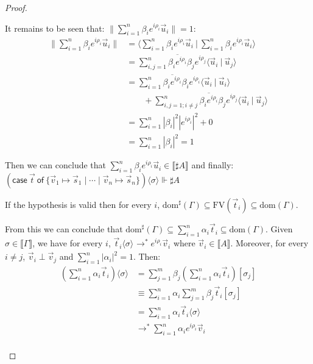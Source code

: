 \documentclass[a4paper,UKenglish,numberwithinsect,pdfa,anonymous]{lipics-v2021}
\theoremstyle{restatestyle}
\newcommand\lra{\longrightarrow}
\newcommand\ansubst[2]{\ensuremath{\langle #1 \rangle_{#2}}}
\newcommand\dom[1]{\mathrm{dom}(#1)}
\newcommand\sdom[1]{\mathrm{dom}^{\sharp}(#1)}
\newcommand\FV[1]{\mathrm{FV}(#1)}
\def\scal#1#2{\langle{#1}~|~{#2}\rangle}
\def\gencase#1#2#3#4#5{\ensuremath{\mathsf{case}~#1~\mathsf{of}~\{#2\mapsto #4 \mid \dotsb \mid #3\mapsto #5\}}}
\def\eval{\lra^*}
\def\sem#1{\llbracket#1\rrbracket}
\def\real{\Vdash}
\begin{document}
\begin{proof}
\begin{description}
    It remains to be seen that: $\|\sum_{i=1}^{n}\beta_i e^{i\rho_i} \vec{u}_{i}\|=1$:
    \begin{align*}
        \|\sum_{i=1}^{n}\beta_i e^{i\rho_i} \vec{u}_{i}\| &= \scal{\sum_{i=1}^{n}\beta_i e^{i\rho_i} \vec{u}_{i}}{\sum_{i=1}^{n}\beta_i e^{i\rho_i} \vec{u}_{i}}\\
        &= \sum_{i,j=1}^{n}\overline{\beta_i e^{i\rho_i}}\beta_j e^{i\rho_j} \scal{\vec{u}_{i}}{\vec{u}_{j}}\\
        &= \sum_{i=1}^{n}\overline{\beta_i e^{i\rho_i}}\beta_i e^{i\rho_i} \scal{\vec{u}_{i}}{\vec{u}_{i}}\\
        &\qquad + \sum_{i,j=1; i\neq j}^{n}\overline{\beta_i e^{i\rho_i}}\beta_j e^{i\rho_j} \scal{\vec{u}_{i}}{\vec{u}_{j}}\\
        &= \sum_{i=1}^{n}|\beta_i|^2 |e^{i\rho_i}|^2  + 0\\
        &= \sum_{i=1}^{n}|\beta_i|^2 = 1
    \end{align*}

    Then we can conclude that $\sum_{i=1}^{n}\beta_i e^{i\rho_i}\vec{u}_{i}\in\sem{\sharp A}$ and finally: $(\gencase{\vec{t}}{\vec{v}_{1}}{\vec{v}_{n}}{\vec{s}_{1}}{\vec{s}_{n}})\ansubst{\sigma}{}\real\sharp A $
  
    \item[Sum] If the hypothesis is valid then for every $i$, $\sdom{\Gamma}\subseteq\FV{\vec{t}_{i}}\subseteq\dom{\Gamma}$.
    
    From this we can conclude that $\sdom{\Gamma}\subseteq\sum_{i=1}^{n}\alpha_i \vec{t}_{i}\subseteq\dom{\Gamma}$. Given $\sigma\in\sem{\Gamma}$, we have for every $i$, $\vec{t}_{i}\ansubst{\sigma}{}\eval e^{i\rho_i} \vec{v}_{i}$ where $\vec{v}_{i}\in\sem{A}$. Moreover, for every $i\neq j$, $\vec{v}_{i}\perp\vec{v}_{j}$ and $\sum_{i=1}^{n}|\alpha_i|^2=1$. Then:
    \begin{align*}
    (\sum_{i=1}^{n}\alpha_i\vec{t}_{i})\ansubst{\sigma}{} 
    &= \sum_{j=1}^{m}\beta_j(\sum_{i=1}^{n}\alpha_i \vec{t}_{i})[\sigma_j]\\
    &\equiv \sum_{i=1}^{n} \alpha_i \sum_{j=1}^{m} \beta_j \vec{t}_{i}[\sigma_j]\\
    &=\sum_{i=1}^{n} \alpha_i \vec{t}_{i}\ansubst{\sigma}{}\\
    &\eval \sum_{i=1}^{n} \alpha_i e^{i\rho_i} \vec{v}_{i}\\
    \end{align*}


\end{description}
\end{proof}
\end{document}
